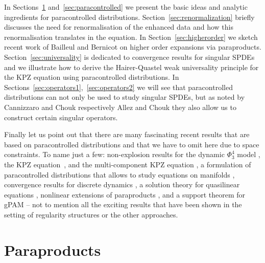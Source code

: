 \documentclass[a4paper, 11pt]{article}
\begin{document}
In Sections~\ref{sec:paraproducts} and~\ref{sec:paracontrolled} we present the basic ideas and analytic ingredients for paracontrolled distributions. Section~\ref{sec:renormalization} briefly discusses the need for renormalisation of the enhanced data and how this renormalisation translates in the equation. In Section~\ref{sec:higherorder} we sketch recent work of Bailleul and Bernicot on higher order expansions via paraproducts. Section~\ref{sec:universality} is dedicated to convergence results for singular SPDEs and we illustrate how to derive the Hairer-Quastel weak universality principle for the KPZ equation using paracontrolled distributions. In Sections~\ref{sec:operators1},~\ref{sec:operators2} we will see that paracontrolled distributions can not only be used to study singular SPDEs, but as noted by Cannizzaro and Chouk respectively Allez and Chouk they also allow us to construct certain singular operators.

Finally let us point out that there are many fascinating recent results that are based on paracontrolled distributions and that we have to omit here due to space constraints. To name just a few: non-explosion results for the dynamic $\Phi^4_3$ model \cite{mourrat_global_2016}, the KPZ equation~\cite{gubinelli_kpz_2017}, and the multi-component KPZ equation \cite{funaki_coupled_2016}, a formulation of paracontrolled distributions that allows to study equations on manifolds \cite{bailleul_heat_2016}, convergence results for discrete dynamics \cite{zhu_approximating_2014, zhu_wong_2015, gubinelli_kpz_2017, chouk_invariance_2016}, a solution theory for quasilinear equations \cite{bailleul_quasilinear_2016}, nonlinear extensions of paraproducts \cite{furlan_paracontrolled_2016}, and a support theorem for gPAM \cite{chouk_support_2014} -- not to mention all the exciting results that have been shown in the setting of regularity structures or the other approaches.

\section{Paraproducts}\label{sec:paraproducts}
\end{document}
